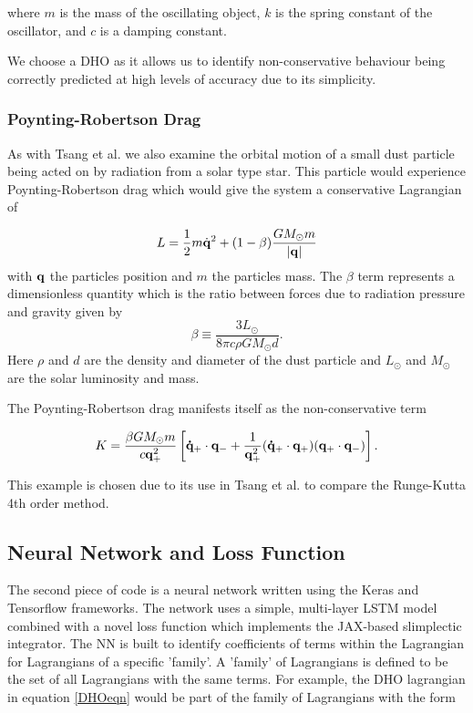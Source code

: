 \documentclass[10pt]{iopart}
\begin{document}
where $m$ is the mass of the oscillating object, $k$ is the spring constant of the oscillator, and $c$ is a damping constant.  

We choose a DHO as it allows us to identify non-conservative behaviour being correctly predicted at high levels of accuracy due to its simplicity. 

\subsubsection{Poynting-Robertson Drag \\}
\label{PRD}
As with Tsang et al. \cite{Tsang_Slimplectic} we also examine the orbital motion of a small dust particle being acted on by radiation from a solar type star. This particle would experience Poynting-Robertson drag \cite{Poynting-Robertson} which would give the system a conservative Lagrangian of 

\begin{equation}
	L = \frac{1}{2}m\dot{\bold{q}}^2 + (1-\beta)\frac{GM_\odot m}{|\bold{q}|}
\end{equation} 
with $\bold{q}$ the particles position and $m$ the particles mass. The $\beta$ term represents a dimensionless quantity which is the ratio between forces due to radiation pressure and gravity given by 
\begin{equation}
	\beta\equiv\frac{3L_\odot}{8\pi c\rho GM_\odot d}.
\end{equation}
Here $\rho$ and $d$ are the density and diameter of the dust particle and $L_\odot$ and $M_\odot$ are the solar luminosity and mass.

The Poynting-Robertson drag manifests itself as the non-conservative term

\begin{equation}
	K = \frac{\beta GM_\odot m}{c\bold{q}_+^2}\left[\bold{\dot{q}}_+\cdot \bold{q}_- + \frac{1}{\bold{q}_+^2}(\bold{\dot{q}}_+\cdot\bold{q}_+)(\bold{q}_+\cdot\bold{q}_-)\right].
\end{equation}

This example is chosen due to its use in Tsang et al. \cite{Tsang_Slimplectic} to compare the Runge-Kutta 4th order method.

\subsection{Neural Network and Loss Function}
The second piece of code is a neural network written using the Keras \cite{Keras} and Tensorflow \cite{TF} frameworks. The network uses a simple, multi-layer LSTM model \cite{LSTM} combined with a novel loss function which implements the JAX-based slimplectic integrator. The NN is built to identify coefficients of terms within the Lagrangian for Lagrangians of a specific 'family'. A 'family' of Lagrangians is defined to be the set of all Lagrangians with the same terms. For example, the DHO lagrangian in equation \ref{DHOeqn} would be part of the family of Lagrangians with the form 
\end{document}
